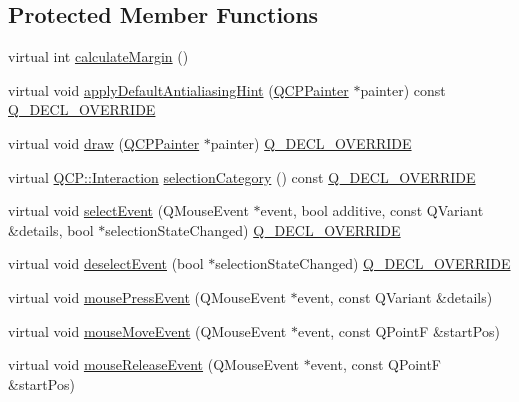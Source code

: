 \subsection*{Protected Member Functions}
\begin{DoxyCompactItemize}
\item 
virtual int \hyperlink{class_q_c_p_axis_a47bdb0a55de6759489ee47665199aebb}{calculate\+Margin} ()
\item 
virtual void \hyperlink{class_q_c_p_axis_adbaeffcdc2707f2bd5dc1bbd11236770}{apply\+Default\+Antialiasing\+Hint} (\hyperlink{class_q_c_p_painter}{Q\+C\+P\+Painter} $\ast$painter) const \hyperlink{qcustomplot_8h_a42cc5eaeb25b85f8b52d2a4b94c56f55}{Q\+\_\+\+D\+E\+C\+L\+\_\+\+O\+V\+E\+R\+R\+I\+DE}
\item 
virtual void \hyperlink{class_q_c_p_axis_ac15ebb4225ca5212d8e5fffae481bc9b}{draw} (\hyperlink{class_q_c_p_painter}{Q\+C\+P\+Painter} $\ast$painter) \hyperlink{qcustomplot_8h_a42cc5eaeb25b85f8b52d2a4b94c56f55}{Q\+\_\+\+D\+E\+C\+L\+\_\+\+O\+V\+E\+R\+R\+I\+DE}
\item 
virtual \hyperlink{namespace_q_c_p_a2ad6bb6281c7c2d593d4277b44c2b037}{Q\+C\+P\+::\+Interaction} \hyperlink{class_q_c_p_axis_ab751e3e96495716a2f6742ca7d7b3d49}{selection\+Category} () const \hyperlink{qcustomplot_8h_a42cc5eaeb25b85f8b52d2a4b94c56f55}{Q\+\_\+\+D\+E\+C\+L\+\_\+\+O\+V\+E\+R\+R\+I\+DE}
\item 
virtual void \hyperlink{class_q_c_p_axis_a50c3ed18e189d48421ec2978f88e4f87}{select\+Event} (Q\+Mouse\+Event $\ast$event, bool additive, const Q\+Variant \&details, bool $\ast$selection\+State\+Changed) \hyperlink{qcustomplot_8h_a42cc5eaeb25b85f8b52d2a4b94c56f55}{Q\+\_\+\+D\+E\+C\+L\+\_\+\+O\+V\+E\+R\+R\+I\+DE}
\item 
virtual void \hyperlink{class_q_c_p_axis_a5bc1f8a8d0fbc7658eba70c80279ed31}{deselect\+Event} (bool $\ast$selection\+State\+Changed) \hyperlink{qcustomplot_8h_a42cc5eaeb25b85f8b52d2a4b94c56f55}{Q\+\_\+\+D\+E\+C\+L\+\_\+\+O\+V\+E\+R\+R\+I\+DE}
\item 
virtual void \hyperlink{class_q_c_p_axis_ac89c068873ee9197a5d2af715bdc1105}{mouse\+Press\+Event} (Q\+Mouse\+Event $\ast$event, const Q\+Variant \&details)
\item 
virtual void \hyperlink{class_q_c_p_axis_a2a89a13440eec099fc2327c2672be0cd}{mouse\+Move\+Event} (Q\+Mouse\+Event $\ast$event, const Q\+PointF \&start\+Pos)
\item 
virtual void \hyperlink{class_q_c_p_axis_a35663b938ad83e91c0b8e59dbc8c6b18}{mouse\+Release\+Event} (Q\+Mouse\+Event $\ast$event, const Q\+PointF \&start\+Pos)

\end{DoxyCompactItemize}
